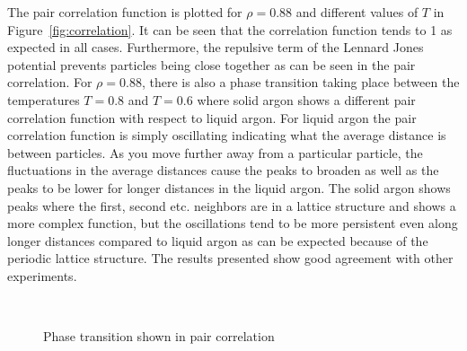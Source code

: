 \documentclass[
10pt, %
a4paper, %
oneside, %
headinclude,footinclude, %
BCOR5mm, %
]{scrartcl}
\begin{document}
The pair correlation function is plotted for $\rho = 0.88$ and different values of $T$ in Figure~\vref{fig:correlation}. It can be seen that the correlation function tends to 1 as expected in all cases. Furthermore, the repulsive term of the Lennard Jones potential prevents particles being close together as can be seen in the pair correlation. For $\rho = 0.88$, there is also a phase transition taking place between the temperatures $T=0.8$ and $T=0.6$ where solid argon shows a different pair correlation function with respect to liquid argon. For liquid argon the pair correlation function is simply oscillating indicating what the average distance is between  particles. As you move further away from a particular particle, the fluctuations in the average distances cause the peaks to broaden as well as the peaks to be lower for longer distances in the liquid argon. The solid argon shows peaks where the first, second etc. neighbors are in a lattice structure and shows a more complex function, but the oscillations tend to be more persistent even along longer distances compared to liquid argon as can be expected because of the periodic lattice structure. The results presented show good agreement with other experiments\cite{Thijssen:2013cp}. 


\begin{figure}[tb]
\centering
{} \quad
{} \\
 \quad
{}
\caption[Pair correlation function of Argon($\rho = 0.88$, $T=0.6$) ]{Phase transition shown in pair correlation} %
\label{fig:correlation}
\end{figure}

\end{document}
